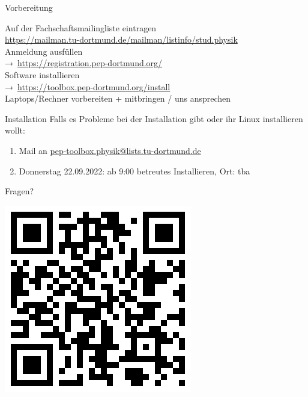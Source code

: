 \begin{frame}{Vorbereitung}
  \begin{center}
    \huge
    Auf der Fachschaftsmailingliste eintragen \\
    \url{https://mailman.tu-dortmund.de/mailman/listinfo/stud.physik}\\[0.5\baselineskip]
    Anmeldung ausfüllen\\
    →~\textcolor{blue!70!black}{\url{https://registration.pep-dortmund.org/}}\\[0.5\baselineskip]
    Software installieren\\
    →~\textcolor{blue!70!black}{\url{https://toolbox.pep-dortmund.org/install}}\\[0.5\baselineskip]
    Laptops/Rechner vorbereiten + mitbringen / uns ansprechen
  \end{center}
\end{frame}
\begin{frame}{Installation}
  \huge
  Falls es Probleme bei der Installation gibt oder ihr Linux installieren wollt:\\[0.5\baselineskip]
  \begin{enumerate}
    \item Mail an \href{mailto:pep-toolbox.physik@lists.tu-dortmund.de}{pep-toolbox.physik@lists.tu-dortmund.de}
    \item Donnerstag 22.09.2022: ab 9:00 betreutes Installieren, Ort: tba
  \end{enumerate}
\end{frame}
\begin{frame}
  \begin{minipage}{.5\textwidth}
    \Huge\centering
    \textcolor{red!70!black}{Fragen?}
  \end{minipage}
  \begin{minipage}{.49\textwidth}
    \centering
    \includegraphics[width=.8\textwidth]{../qrcode/toolbox_qrcode.png}
  \end{minipage}
\end{frame}

